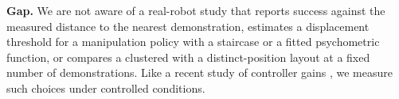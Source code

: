 \textbf{Gap.}
We are not aware of a real-robot study that reports success against the measured distance to the nearest demonstration, estimates a displacement threshold for a manipulation policy with a staircase or a fitted psychometric function, or compares a clustered with a distinct-position layout at a fixed number of demonstrations. Like a recent study of controller gains \cite{bronars2026tune}, we measure such choices under controlled conditions.
